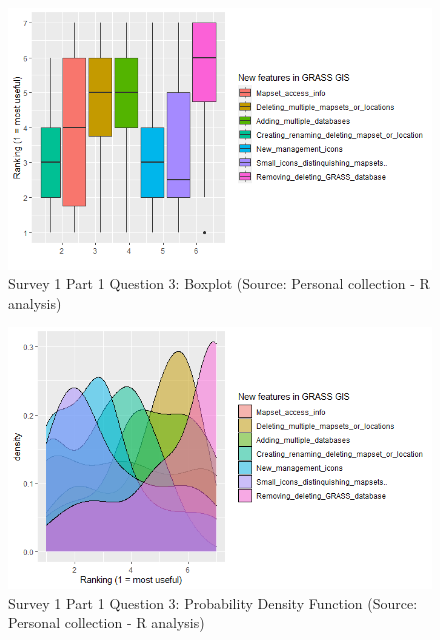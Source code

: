 \documentclass[a4paper,10pt,twoside]{article}
\begin{document}
\newpage
\vspace{0.3cm}
\begin{figure}[hbt!] 
\begin{center}
\includegraphics[width=15.5cm]{../surveys/analyzed_data/survey1_part1_question3_boxplot_r.png} 
\caption[Survey 1 Part 1 Question 3: Boxplot]{Survey 1 Part 1 Question 3: Boxplot (Source: Personal collection - R analysis)}
\label{fig:survey1_part1_question3_boxplot_r}
\end{center}
\end{figure}

\vspace{0.3cm}
\begin{figure}[hbt!] 
\begin{center}
\includegraphics[width=15.5cm]{../surveys/analyzed_data/survey1_part1_question3_pdf.png} 
\caption[Survey 1 Part 1 Question 3: Probability Density Function]{Survey 1 Part 1 Question 3: Probability Density Function (Source: Personal collection - R analysis)}
\label{fig:survey1_part1_question3_pdf}
\end{center}
\end{figure}
\end{document}
